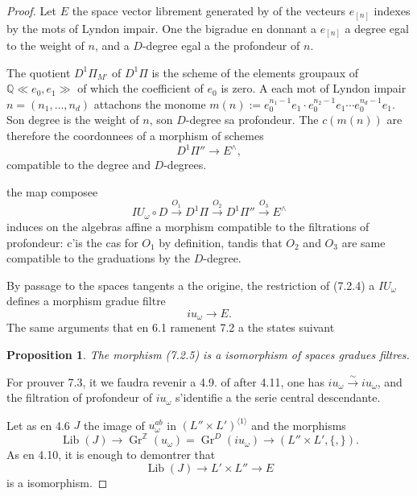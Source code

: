 \documentclass[11pt,a4paper]{article}
\theoremstyle{plain}
\newtheorem{proposition}[theorem]{Proposition}
\theoremstyle{definition}
\DeclareMathOperator{\Lib}{Lib}
\newcommand{\Q}{\mathbb{Q}}
\newcommand{\Z}{\mathbb{Z}}
\newcommand{\Gr}{\operatorname{Gr}}
\begin{document}
\begin{proof}
Let $E$ the space vector librement generated by of the vecteurs $e_{[n]}$ indexes by the mots of Lyndon impair. One the bigradue en donnant a $e_{[n]}$ a degree egal to the weight of $n$, and a $D$-degree egal a the profondeur of $n$.

The quotient $D^1\Pi_{M'}$ of $D^1\Pi$ is the scheme of the elements groupaux of $\Q \ll e_0, e_1 \gg$ of which the coefficient of $e_0$ is zero. A each mot of Lyndon impair $n = (n_1,\ldots,n_d)$ attachons the monome $m(n) := e_0^{n_1-1}e_1 \cdot e_0^{n_2-1}e_1 \cdots e_0^{n_d-1}e_1$. Son degree is the weight of $n$, son $D$-degree sa profondeur. The $c(m(n))$ are therefore the coordonnees of a morphism of schemes
\begin{equation}\label{eq:7.2.3}
D^1\Pi'' \to E^{\wedge},
\end{equation}
compatible to the degree and $D$-degrees.

the map composee
\begin{equation}\label{eq:7.2.4}
IU_\omega \circ D \xrightarrow{O_1} D^1\Pi \xrightarrow{O_2} D^1\Pi'' \xrightarrow{O_3} E^{\wedge}
\end{equation}
induces on the algebras affine a morphism compatible to the filtrations of profondeur: c'is the cas for $O_1$ by definition, tandis that $O_2$ and $O_3$ are same compatible to the graduations by the $D$-degree.

By passage to the spaces tangents a the origine, the restriction of (7.2.4) a $IU_\omega$ defines a morphism gradue filtre
\begin{equation}\label{eq:7.2.5}
iu_\omega \to E.
\end{equation}
The same arguments that en 6.1 ramenent 7.2 a the states suivant

\begin{proposition}\label{prop:7.3}
The morphism (7.2.5) is a isomorphism of spaces gradues filtres.
\end{proposition}

For prouver 7.3, it we faudra revenir a 4.9. of after 4.11, one has $iu_\omega \xrightarrow{\sim} iu_\omega$, and the filtration of profondeur of $iu_\omega$ s'identifie a the serie central descendante.

Let as en 4.6 $J$ the image of $u_\omega^{ab}$ in $(L'' \times L')^{\langle 1 \rangle}$ and the morphisms
\begin{equation}\label{eq:7.3.1}
\Lib(J) \to \Gr^\Z(u_\omega) = \Gr^D(iu_\omega) \to (L'' \times L', \{,\}).
\end{equation}
As en 4.10, it is enough to demontrer that
\begin{equation}\label{eq:7.3.2}
\Lib(J) \to L' \times L'' \to E
\end{equation}
is a isomorphism.


\end{proof}
\end{document}
